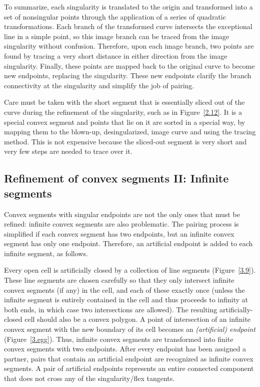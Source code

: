 To summarize, each singularity is translated to the origin and transformed 
into a set of nonsingular points through the application of a series of quadratic 
transformations.  Each branch of the transformed curve intersects the 
exceptional line in a simple point, so this image branch can be traced
from the image singularity without confusion.
Therefore, upon each image branch, two points are found by tracing a very 
short distance in either direction from the image singularity.
Finally, these points are mapped back to the original curve
to become new endpoints, replacing the singularity.
These new endpoints clarify the branch connectivity at the singularity
and simplify the job of pairing.

Care must be taken with the short segment that is essentially sliced
out of the curve during the refinement of the singularity, such as 
 in Figure~\ref{2.12}.
It is a special convex segment and points that lie on it are sorted in a special
way, by mapping them to the blown-up, desingularized, image curve and using 
the tracing method.
This is not expensive because the sliced-out segment is very short and
very few steps are needed to trace over it.

\subsection{Refinement of convex segments II: Infinite segments}
\label{sec-refine2}

Convex segments with singular endpoints are not the only ones that must
be refined: infinite convex segments are also problematic.
The pairing process is simplified if each convex segment has two endpoints,
but an infinite convex segment has only one endpoint.
Therefore, an artificial endpoint is added to each infinite segment, as follows.

Every open cell is artificially closed by a collection of line segments 
(Figure~\ref{3.9}).
These line segments are chosen carefully so that they only intersect 
infinite convex segments (if any) in the cell, and each of these exactly once 
(unless the infinite segment is entirely contained in the cell and thus proceeds
to infinity at both ends, in which case two intersections are allowed).
The resulting artificially-closed cell should also be a convex polygon.
A point of intersection of an infinite convex segment with the new boundary
of its cell becomes an {\em (artificial) endpoint} (Figure~\ref{3.egg}).
Thus, infinite convex segments are transformed into finite convex segments
with two endpoints.
After every endpoint has been assigned a partner, pairs that contain an
artificial endpoint are recognized as infinite convex segments.
A pair of artificial endpoints represents an entire connected component that does not 
cross any of the singularity/flex tangents.

